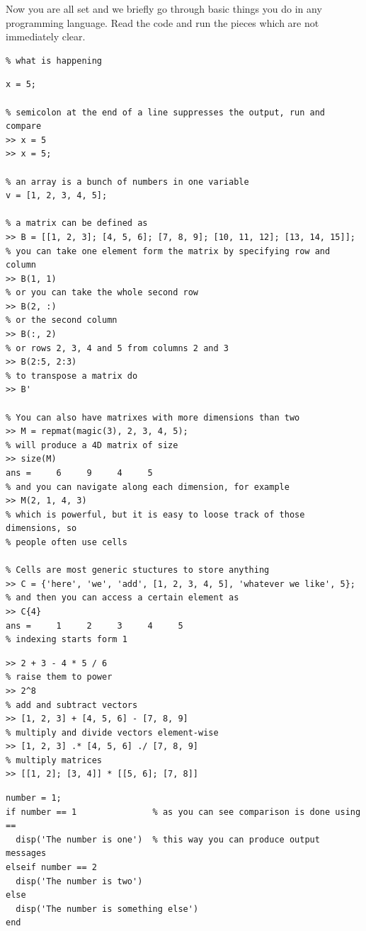 \documentclass[a4paper,11pt]{article}
\begin{document}
Now you are all set and we briefly go through basic things you do in any programming language. Read the code and run the pieces which are not immediately clear.


%
%
\begin{lstlisting}[caption = {Comments}]
% This is a comment, write comments to explain tricky parts of code and outline
% what is happening
\end{lstlisting}

\begin{lstlisting}[caption = {Variables}]
% variable can hold any kind of data, you do not need to specify the type
x = 5;

% semicolon at the end of a line suppresses the output, run and compare
>> x = 5
>> x = 5;

% an array is a bunch of numbers in one variable
v = [1, 2, 3, 4, 5];

% a matrix can be defined as
>> B = [[1, 2, 3]; [4, 5, 6]; [7, 8, 9]; [10, 11, 12]; [13, 14, 15]];
% you can take one element form the matrix by specifying row and column
>> B(1, 1)
% or you can take the whole second row
>> B(2, :)
% or the second column
>> B(:, 2)
% or rows 2, 3, 4 and 5 from columns 2 and 3
>> B(2:5, 2:3)
% to transpose a matrix do
>> B'

% You can also have matrixes with more dimensions than two
>> M = repmat(magic(3), 2, 3, 4, 5);
% will produce a 4D matrix of size
>> size(M)
ans =     6     9     4     5
% and you can navigate along each dimension, for example
>> M(2, 1, 4, 3)
% which is powerful, but it is easy to loose track of those dimensions, so
% people often use cells

% Cells are most generic stuctures to store anything
>> C = {'here', 'we', 'add', [1, 2, 3, 4, 5], 'whatever we like', 5};
% and then you can access a certain element as 
>> C{4}
ans =     1     2     3     4     5
% indexing starts form 1
\end{lstlisting}

\begin{lstlisting}[caption = {Arithmetics}]
% You can add, subtract, multiply, divide numbers
>> 2 + 3 - 4 * 5 / 6
% raise them to power
>> 2^8
% add and subtract vectors
>> [1, 2, 3] + [4, 5, 6] - [7, 8, 9]
% multiply and divide vectors element-wise
>> [1, 2, 3] .* [4, 5, 6] ./ [7, 8, 9]
% multiply matrices
>> [[1, 2]; [3, 4]] * [[5, 6]; [7, 8]]
\end{lstlisting}

\begin{lstlisting}[caption = {\texttt{IF - THEN - ELSE}}]
number = 1;
if number == 1               % as you can see comparison is done using ==
  disp('The number is one')  % this way you can produce output messages
elseif number == 2
  disp('The number is two')
else
  disp('The number is something else')
end
\end{lstlisting}
\end{document}
